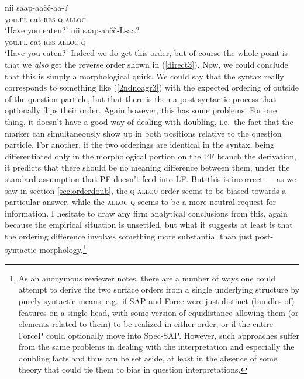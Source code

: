 \documentclass[output=paper, modfonts, nonflat]{langsci/langscibook}
\begin{document}
\ea
 \ea\label{2ndnoagr3}\gll nii\nga{} saap\textrtailt-aa\v{c}\v{c}-aa-\nga?\\
 you.\textsc{pl}{} eat-\textsc{res}-\textsc{q}-\textsc{alloc}\\
 \glt `Have you eaten?'
 \ex\label{direct3}\gll nii\nga{} saap\textrtailt-aa\v{c}\v{c}\U-\nga\L-aa?\\
 you.\textsc{pl}{} eat-\textsc{res}-\textsc{alloc}-\textsc{q}\\ 
 \glt `Have you eaten?' 
 \z
\z
%
Indeed we do get this order, but of course the whole point is that we
\emph{also} get the reverse order shown in (\ref{direct3}). Now, we
could conclude that this is simply a morphological quirk. We could say
that the syntax really corresponds to something like (\ref{2ndnoagr3})
with the expected ordering of \allagr{} outside of the question
particle, but that there is then a post-syntactic process that
optionally flips their order.  Again however, this has some
problems. For one thing, it doesn't have a good way of dealing with
doubling, i.e.\ the fact that the \allagr{} marker can simultaneously
show up in both positions relative to the question particle. For
another, if the two orderings are identical in the syntax, being
differentiated only in the morphological portion on the PF branch the
derivation, it predicts that there should be no meaning difference
between them, under the standard assumption that PF doesn't feed into
LF. But this is incorrect --- as we saw in section
\ref{sec:orderdoub}, the \textsc{q}-\textsc{alloc}{} order seems to be biased
towards a particular answer, while the \textsc{alloc}{}-\textsc{q} seems to be
a more neutral request for information. I hesitate to draw any firm
analytical conclusions from this, again because the empirical
situation is unsettled, but what it suggests at least is that the
ordering difference involves something more substantial than just
post-syntactic morphology.\footnote{As an anonymous reviewer notes,
  there are a number of ways one could attempt to derive the two
  surface orders from a single underlying structure by purely
  syntactic means, e.g.\ if SAP and Force were just distinct (bundles
  of) features on a single head, with some version of equidistance
  allowing them (or elements related to them) to be realized in either
  order, or if the entire ForceP could optionally move into
  Spec-SAP. However, such approaches suffer from the same problems in
  dealing with the interpretation and especially the doubling facts
  and thus can be set aside, at least in the absence of some theory
  that could tie them to bias in question interpretations.}
\end{document}
